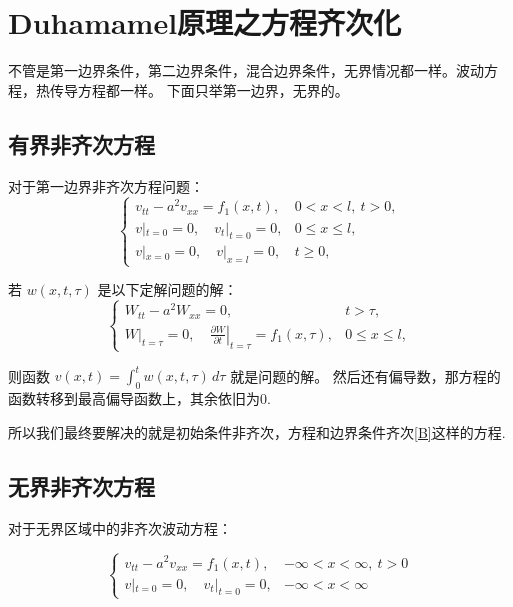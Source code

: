 \documentclass[12pt,a4paper]{article}
\numberwithin{subsection}{section}   %
\numberwithin{subsubsection}{subsection}
\theoremstyle{plain}
\theoremstyle{definition}
\theoremstyle{remark}
\theoremstyle{remark}
\begin{document}
	
	
		\newpage
	\section{Duhamamel原理之方程齐次化}
不管是第一边界条件，第二边界条件，混合边界条件，无界情况都一样。波动方程，热传导方程都一样。	下面只举第一边界，无界的。
	
	
		\subsection{有界非齐次方程}

		
	对于第一边界非齐次方程问题：
	\begin{equation}
		\begin{cases}
			v_{tt} - a^2 v_{xx} = f_1(x, t), & 0 < x < l, \ t > 0, \\
			v|_{t=0} = 0, \quad v_t|_{t=0} = 0, & 0 \leq x \leq l, \\
			v|_{x=0} = 0, \quad v|_{x=l} = 0, & t \geq 0,
		\end{cases}
	\end{equation}
	
	若 \( w(x, t, \tau) \) 是以下定解问题的解：
	\begin{equation}
		\begin{cases}
			W_{tt} - a^2 W_{xx} = 0, & t > \tau, \\
			W|_{t=\tau} = 0, \quad \left. \frac{\partial W}{\partial t} \right|_{t=\tau} = f_1(x, \tau), & 0 \leq x \leq l,
		\end{cases}
	\end{equation}
	
	则函数 \( v(x, t) = \int_0^t w(x, t, \tau) \, d\tau \) 就是问题的解。
	然后还有偏导数，那方程的函数转移到最高偏导函数上，其余依旧为0.

所以我们最终要解决的就是初始条件非齐次，方程和边界条件齐次\eqref{B}这样的方程.
	
	
	

	\subsection{无界非齐次方程}
	对于无界区域中的非齐次波动方程：
	
\begin{equation}
	\begin{cases}
		v_{tt} - a^2 v_{xx} = f_1(x, t), & -\infty < x < \infty, \ t > 0 \\
		v|_{t=0} = 0, \quad v_t|_{t=0} = 0, & -\infty < x < \infty
	\end{cases}
\end{equation}
	
\end{document}
